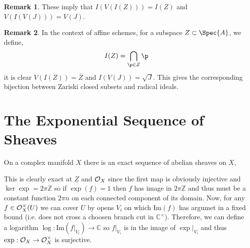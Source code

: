 \documentclass[12pt]{extarticle}
\newcommand{\Z}{\mathbb{Z}}
\renewcommand{\Im}[1]{\mathrm{Im}(#1)}
\theoremstyle{definition}
\newtheorem{remark}{Remark}
\newenvironment{definition}[1][Definition:]{\begin{trivlist}
\item[\hskip \labelsep {\bfseries #1}]}{\end{trivlist}}
\newcommand{\C}{\mathbb{C}}
\begin{document}
\begin{remark}
These imply that $I(V(I(Z))) = I(Z)$ and $V(I(V(J))) = V(J)$.
\end{remark}

\begin{remark}
In the context of affine schemes, for a subspace $Z \subset \Spec{A}$, we define,
\[ I(Z) = \bigcap_{\p \in Z} \p \] 
 it is clear $V(I(Z)) = \overline{Z}$ and $I(V(J)) = \sqrt{J}$. This gives the corresponding bijection between Zariski closed subsets and radical ideals.
\end{remark}

\section{The Exponential Sequence of Sheaves}

\newcommand{\Piczero}[1]{\mathrm{Pic}^0\left( #1 \right)}

\begin{definition}
On a complex manifold $X$ there is an exact sequence of abelian sheaves on $X$,
\begin{center}
\end{center}
This is clearly exact at $\underline{Z}$ and $\mathcal{O}_{X}$ since the first map is obviously injective and $\ker{\exp} = 2 \pi \Z$ so if $\exp(f) = 1$ then $f$ has image in $2 \pi \Z$ and thus must be a constant function $2 \pi n$ on each connected component of its domain. Now, for any $f \in \mathcal{O}_{X}^\times(U)$ we can cover $U$ by opens $V_i$ on which $\Im{f}$ has argumet in a fixed bound (i.e. does not cross a choosen branch cut in $\C^\times$). Therefore, we can define a logarithm $\log : \Im{f|_{V_i}} \to \C$ so $f|_{V_i}$ is in the image of $\exp |_{V_i}$ and thus $\exp : \mathcal{O}_{X} \to \mathcal{O}_{X}^\times$ is surjective.
\end{definition}
\end{document}
